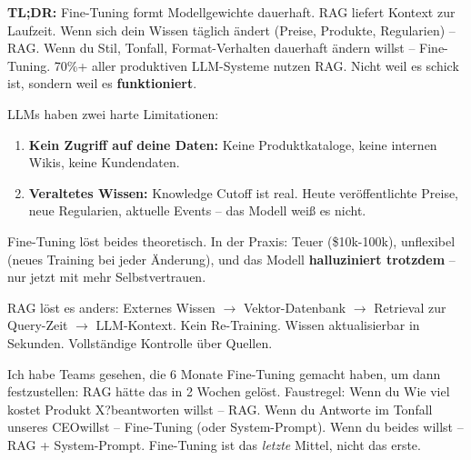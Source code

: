 \par\mbox{}\par
\begin{praxishinweisEnv}
\textbf{TL;DR:} Fine-Tuning formt Modellgewichte dauerhaft. RAG liefert Kontext zur Laufzeit.
Wenn sich dein Wissen täglich ändert (Preise, Produkte, Regularien) -- RAG.
Wenn du Stil, Tonfall, Format-Verhalten dauerhaft ändern willst -- Fine-Tuning.
70\%+ aller produktiven LLM-Systeme nutzen RAG. Nicht weil es schick ist, sondern weil es \textbf{funktioniert}.
\end{praxishinweisEnv}

LLMs haben zwei harte Limitationen:
\begin{enumerate}[leftmargin=*]
    \item \textbf{Kein Zugriff auf deine Daten:} Keine Produktkataloge, keine internen Wikis, keine Kundendaten.
    \item \textbf{Veraltetes Wissen:} Knowledge Cutoff ist real. Heute veröffentlichte Preise, neue Regularien, aktuelle Events -- das Modell weiß es nicht.
\end{enumerate}

Fine-Tuning löst beides theoretisch. In der Praxis: Teuer (\$10k-100k), unflexibel (neues Training bei jeder Änderung), und das Modell \textbf{halluziniert trotzdem} -- nur jetzt mit mehr Selbstvertrauen.

RAG löst es anders: Externes Wissen $\to$ Vektor-Datenbank $\to$ Retrieval zur Query-Zeit $\to$ LLM-Kontext.
Kein Re-Training. Wissen aktualisierbar in Sekunden. Vollständige Kontrolle über Quellen.

\par



\par\mbox{}\par
\begin{realitycheckEnv}
Ich habe Teams gesehen, die 6 Monate Fine-Tuning gemacht haben, um dann festzustellen: RAG hätte das in 2 Wochen gelöst.
Faustregel: Wenn du \glqq Wie viel kostet Produkt X?\grqq beantworten willst -- RAG.
Wenn du \glqq Antworte im Tonfall unseres CEO\grqq willst -- Fine-Tuning (oder System-Prompt).
Wenn du beides willst -- RAG + System-Prompt. Fine-Tuning ist das \textit{letzte} Mittel, nicht das erste.
\end{realitycheckEnv}

